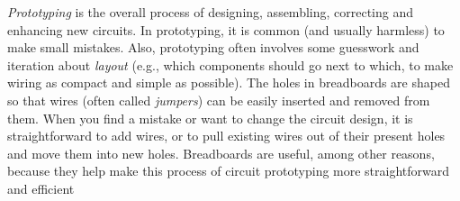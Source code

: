 \emph{Prototyping} is the overall process of designing, assembling, correcting and enhancing new circuits. 
In prototyping, it is common (and usually harmless) to make small mistakes. 
Also, prototyping often involves some guesswork and iteration about \emph{layout} (e.g., which components should go next to which, to make wiring as compact and simple as possible).
The holes in breadboards are shaped so that wires (often called \emph{jumpers}) can be easily inserted and removed from them.
When you find a mistake or want to change the circuit design, it is straightforward to add wires, or to pull existing wires out of their present holes and move them into new holes.
Breadboards are useful, among other reasons, because they help make this process of circuit prototyping more straightforward and efficient

